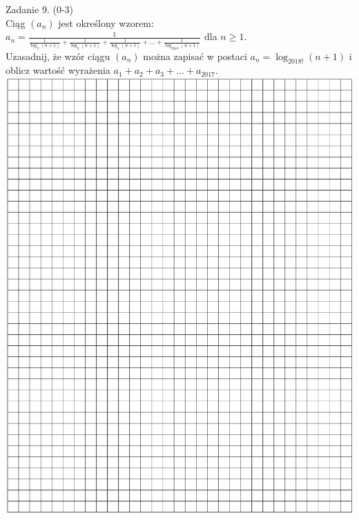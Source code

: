 \documentclass[10pt]{article}
\begin{document}
Zadanie 9. (0-3)\\
Ciąg \(\left(a_{n}\right)\) jest określony wzorem:\\
\(a_{n}=\frac{1}{\frac{1}{\log _{2}(n+1)}+\frac{1}{\log _{3}(n+1)}+\frac{1}{\log _{4}(n+1)}+\ldots+\frac{1}{\log _{2018}(n+1)}}\) dla \(n \geqslant 1\).\\
Uzasadnij, że wzór ciągu \(\left(a_{n}\right)\) można zapisać w postaci \(a_{n}=\log _{2018!}(n+1)\) i oblicz wartość wyrażenia \(a_{1}+a_{2}+a_{3}+\ldots+a_{2017}\).\\
\includegraphics[max width=\textwidth, center]{2024_11_21_a7a52c0c0974ad42b88bg-06}
\end{document}
